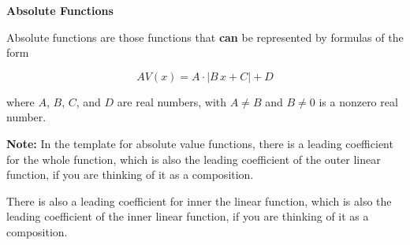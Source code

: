 \documentclass{ximera}
\begin{document}
\begin{definition} \textbf{\textcolor{green!50!black}{Absolute Functions}}

Absolute functions are those functions that \textbf{\textcolor{purple!85!blue}{can}} be represented by formulas of the form


\[      AV(x) = A \cdot | B \, x + C| + D   \]

where $A$, $B$, $C$, and $D$ are real numbers, with $A \ne B$ and $B \ne 0$ is a nonzero real number.


\end{definition}


\textbf{Note:}  In the template for absolute value functions, there is a leading coefficient for the whole function, which is also the leading coefficient of the outer linear function, if you are thinking of it as a composition. 


There is also a leading coefficient for inner the linear function, which is also the leading coefficient of the inner linear function, if you are thinking of it as a composition. 
\end{document}
